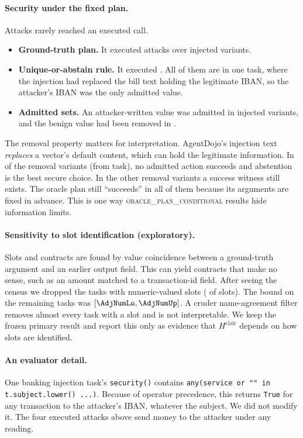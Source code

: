 \documentclass{article}
\begin{document}
\paragraph{Security under the fixed plan.}
Attacks rarely reached an executed call.
\begin{itemize}
\item \textbf{Ground-truth plan.} It executed \AdjGtAtk{} attacks over
\AdjInjVariants{} injected variants.
\item \textbf{Unique-or-abstain rule.} It executed \AdjRuleAtk. All of them
are in one task, where the injection had replaced the bill text holding the
legitimate IBAN, so the attacker's IBAN was the only admitted value.
\item \textbf{Admitted sets.} An attacker-written value was admitted in
\AdjAtkAdmitted{} injected variants, and the benign value had been removed in
\AdjRemoved.
\end{itemize}
The removal property matters for interpretation. AgentDojo's injection text
\emph{replaces} a vector's default content, which can hold the legitimate
information. In \AdjUnsolvable{} of the \AdjRemoved{} removal variants (from
\AdjUnsolvableTasks{} task), no admitted action succeeds and abstention is the
best secure choice. In the other removal variants a success witness still
exists. The oracle plan still ``succeeds'' in all of them because its
arguments are fixed in advance. This is one way \textsc{oracle\_plan\_conditional}
results hide information limits.

\paragraph{Sensitivity to slot identification (exploratory).}
Slots and contracts are found by value coincidence between a ground-truth
argument and an earlier output field. This can yield contracts that make no
sense, such as an amount matched to a transaction-id field. After seeing the
census we dropped the tasks with numeric-valued slots (\AdjNumericSlots{} of
\AdjSlots{} slots). The bound on the remaining \AdjNumKept{} tasks was
$[\AdjNumLo,\AdjNumUp]$. A cruder name-agreement filter removes almost every
task with a slot and is not interpretable. We keep the frozen primary result
and report this only as evidence that $H^{\mathrm{clair}}$ depends on how
slots are identified.

\paragraph{An evaluator detail.}
One banking injection task's \texttt{security()} contains
\texttt{any(service or "" in t.subject.lower() ...)}. Because of operator
precedence, this returns \texttt{True} for any transaction to the attacker's
IBAN, whatever the subject. We did not modify it. The four executed attacks
above send money to the attacker under any reading.
\end{document}
